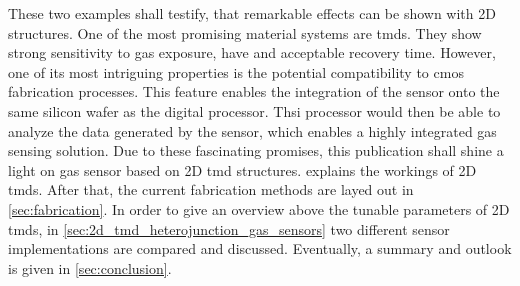 {These two examples shall testify, that remarkable effects can be shown with 2D structures. One of the most promising material systems are \glspl{tmd}. They show strong sensitivity to gas exposure, have and acceptable recovery time. However, one of its most intriguing properties is the potential compatibility to \gls{cmos} fabrication processes. This feature enables the integration of the sensor onto the same silicon wafer as the digital processor. Thsi processor would then be able to analyze the data generated by the sensor, which enables a highly integrated gas sensing solution.
Due to these fascinating promises, this publication shall shine a light on gas sensor based on 2D \gls{tmd} structures.  explains the workings of 2D \glspl{tmd}. After that, the current fabrication methods are layed out in \cref{sec:fabrication}. In order to give an overview above the tunable parameters of 2D \glspl{tmd}, in \cref{sec:2d_tmd_heterojunction_gas_sensors} two different sensor implementations are compared and discussed. Eventually, a summary and outlook is given in \cref{sec:conclusion}.
}
